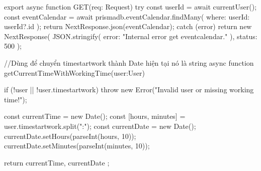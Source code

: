export async function GET(req: Request) {
  try {
    const userId = await currentUser();
    const eventCalendar = await prismadb.eventCalendar.findMany({
      where: {
        userId: userId?.id 
      }
    });
    return NextResponse.json(eventCalendar);
  } catch (error) {
    return new NextResponse(
      JSON.stringify({ error: "Internal error get eventcalendar." }),
      { status: 500 }
    );
  }
}

//Dùng để chuyển timestartwork thành Date hiện tại nó là string
async function getCurrentTimeWithWorkingTime(user:User) {
  if (!user || !user.timestartwork) {
      throw new Error("Invalid user or missing working time!");
  }

  const currentTime = new Date();
  const [hours, minutes] = user.timestartwork.split(":");
  const currentDate = new Date();
  currentDate.setHours(parseInt(hours, 10));
  currentDate.setMinutes(parseInt(minutes, 10));

  return { currentTime, currentDate };
}



